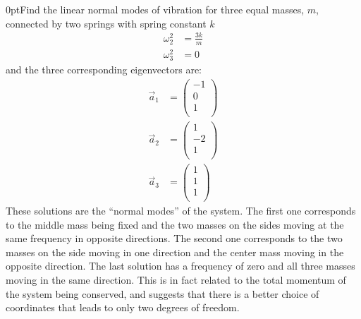 \begin{example}{0pt}{Find the linear normal modes of vibration for three equal masses, $m$, connected by two springs with spring constant $k$}{}
\begin{align*}
\omega_2^2&=\frac{3k}{m}\\
\omega_3^2&=0
\end{align*}
and the three corresponding eigenvectors are:
\begin{align*}
\vec{a}_1&=\left(\begin{array}{c}
-1 \\0 \\1\\
\end{array} \right)\nonumber\\
\vec{a}_2&=\left(\begin{array}{c}
1 \\ -2 \\1\\
\end{array} \right)\nonumber\\
\vec{a}_3&=\left(\begin{array}{c}
1 \\ 1 \\1\\
\end{array} \right)
\end{align*}
These solutions are the ``normal modes'' of the system. The first one corresponds to the middle mass being fixed and the two masses on the sides moving at the same frequency in opposite directions. The second one corresponds to the two masses on the side moving in one direction and the center mass moving in the opposite direction. The last solution has a frequency of zero and all three masses moving in the same direction. This is in fact related to the total momentum of the system being conserved, and suggests that there is a better choice of coordinates that leads to only two degrees of freedom.


\label{ex:threecoupledoscillators}
\end{example}
